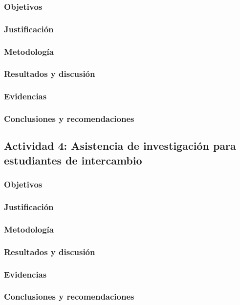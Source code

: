 \documentclass[a4paper, 12pt]{article}
\begin{document}
         \subsubsection{Objetivos} 
         \subsubsection{Justificación}
         \subsubsection{Metodología}
         \subsubsection{Resultados y discusión}
         \subsubsection{Evidencias}
         \subsubsection{Conclusiones y recomendaciones} 

    \subsection{Actividad 4: Asistencia de investigación para estudiantes de intercambio}

         \subsubsection{Objetivos} 
         \subsubsection{Justificación}
         \subsubsection{Metodología}
         \subsubsection{Resultados y discusión}
         \subsubsection{Evidencias}
         \subsubsection{Conclusiones y recomendaciones}
    
\end{document}
